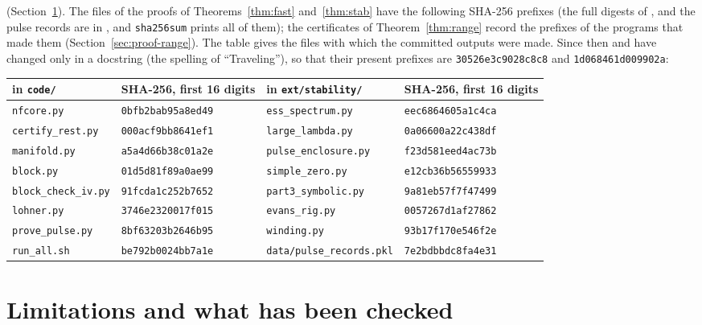 \documentclass[11pt]{article}
\theoremstyle{definition}
\begin{document}
(Section~\ref{sec:limits}). The files of the proofs of Theorems~\ref{thm:fast} and~\ref{thm:stab} have the following SHA-256 prefixes (the full digests of ,  and the pulse records are in , and \texttt{sha256sum} prints all of them); the certificates of Theorem~\ref{thm:range} record the prefixes of the programs that made them (Section~\ref{sec:proof-range}). The table gives the files with which the committed outputs were made. Since then  and  have changed only in a docstring (the spelling of ``Traveling''), so that their present prefixes are \texttt{30526e3c9028c8c8} and \texttt{1d068461d009902a}:

\medskip
{\footnotesize
\begin{tabular}{@{}ll@{\qquad}ll@{}}
\toprule
in \texttt{code/} & SHA-256, first 16 digits & in \texttt{ext/stability/} & SHA-256, first 16 digits \\
\midrule
\texttt{nfcore.py} & \texttt{0bfb2bab95a8ed49} & \texttt{ess\_spectrum.py} & \texttt{eec6864605a1c4ca} \\
\texttt{certify\_rest.py} & \texttt{000acf9bb8641ef1} & \texttt{large\_lambda.py} & \texttt{0a06600a22c438df} \\
\texttt{manifold.py} & \texttt{a5a4d66b38c01a2e} & \texttt{pulse\_enclosure.py} & \texttt{f23d581eed4ac73b} \\
\texttt{block.py} & \texttt{01d5d81f89a0ae99} & \texttt{simple\_zero.py} & \texttt{e12cb36b56559933} \\
\texttt{block\_check\_iv.py} & \texttt{91fcda1c252b7652} & \texttt{part3\_symbolic.py} & \texttt{9a81eb57f7f47499} \\
\texttt{lohner.py} & \texttt{3746e2320017f015} & \texttt{evans\_rig.py} & \texttt{0057267d1af27862} \\
\texttt{prove\_pulse.py} & \texttt{8bf63203b2646b95} & \texttt{winding.py} & \texttt{93b17f170e546f2e} \\
\texttt{run\_all.sh} & \texttt{be792b0024bb7a1e} & \texttt{data/pulse\_records.pkl} & \texttt{7e2bdbbdc8fa4e31} \\
\bottomrule
\end{tabular}}

\section{Limitations and what has been checked}\label{sec:limits}
\end{document}
